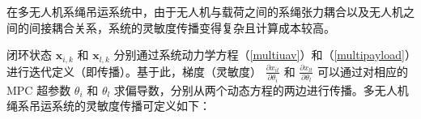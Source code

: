 \documentclass[lang=chs, degree=master, blindreview=true, winfonts=true]{yanputhesis}
\begin{document}

在多无人机系绳吊运系统中，由于无人机与载荷之间的系绳张力耦合以及无人机之间的间接耦合关系，系统的灵敏度传播变得复杂且计算成本较高。

闭环状态 \( \bm x_{i,k} \) 和 \( \bm x_{l,k} \) 分别通过系统动力学方程（\ref{multiuav}）和（\ref{multipayload}）进行迭代定义（即传播）。基于此，梯度（灵敏度） \( \frac{\partial x_{it}}{\partial \theta_i} \) 和 \( \frac{\partial x_{lt}}{\partial \theta_l} \) 可以通过对相应的 MPC 超参数 \( \theta_i \) 和 \( \theta_l \) 求偏导数，分别从两个动态方程的两边进行传播。多无人机绳系吊运系统的灵敏度传播可定义如下：
\end{document}
